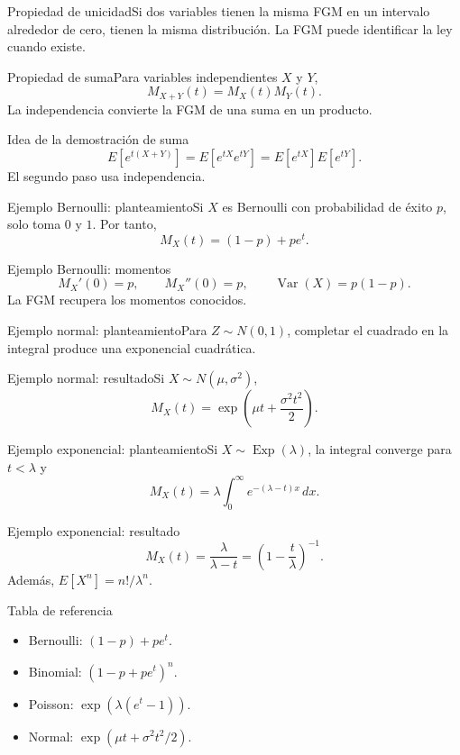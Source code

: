 \documentclass[10pt,aspectratio=169]{beamer}
\begin{document}
\begin{frame}{Propiedad de unicidad}\small Si dos variables tienen la misma FGM en un intervalo alrededor de cero, tienen la misma distribución. La FGM puede identificar la ley cuando existe.\end{frame}
\begin{frame}{Propiedad de suma}\small Para variables independientes $X$ y $Y$,\[M_{X+Y}(t)=M_X(t)M_Y(t).\]La independencia convierte la FGM de una suma en un producto.\end{frame}
\begin{frame}{Idea de la demostración de suma}\small\[E[e^{t(X+Y)}]=E[e^{tX}e^{tY}]=E[e^{tX}]E[e^{tY}].\]El segundo paso usa independencia.\end{frame}
\begin{frame}{Ejemplo Bernoulli: planteamiento}\small Si $X$ es Bernoulli con probabilidad de éxito $p$, solo toma $0$ y $1$. Por tanto,\[M_X(t)=(1-p)+pe^t.\]\end{frame}
\begin{frame}{Ejemplo Bernoulli: momentos}\small\[M_X'(0)=p,\qquad M_X''(0)=p,\qquad\operatorname{Var}(X)=p(1-p).\]La FGM recupera los momentos conocidos.\end{frame}
\begin{frame}{Ejemplo normal: planteamiento}\small Para $Z\sim N(0,1)$, completar el cuadrado en la integral produce una exponencial cuadrática.\end{frame}
\begin{frame}{Ejemplo normal: resultado}\small Si $X\sim N(\mu,\sigma^2)$,\[M_X(t)=\exp\!\left(\mu t+\frac{\sigma^2t^2}{2}\right).\]\end{frame}
\begin{frame}{Ejemplo exponencial: planteamiento}\small Si $X\sim\operatorname{Exp}(\lambda)$, la integral converge para $t<\lambda$ y\[M_X(t)=\lambda\int_0^\infty e^{-(\lambda-t)x}\,dx.\]\end{frame}
\begin{frame}{Ejemplo exponencial: resultado}\small\[M_X(t)=\frac{\lambda}{\lambda-t}=\left(1-\frac t\lambda\right)^{-1}.\]Además, $E[X^n]=n!/\lambda^n$.\end{frame}
\begin{frame}{Tabla de referencia}\small\begin{itemize}\item Bernoulli: $(1-p)+pe^t$.\item Binomial: $(1-p+pe^t)^n$.\item Poisson: $\exp(\lambda(e^t-1))$.\item Normal: $\exp(\mu t+\sigma^2t^2/2)$.\end{itemize}\end{frame}
\end{document}
